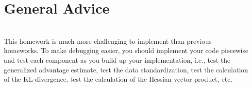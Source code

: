 \documentclass[12pt]{article}
\begin{document}
\section*{General Advice}
\ \\
This homework is much more challenging to implement than previous homeworks.  To make debugging easier, you should implement your code piecewise and test each component as you build up your implementation, i.e., test the generalized advantage estimate, test the data standardization, test the calculation of the KL-divergence, test the calculation of the Hessian vector product, etc.


\end{document}
